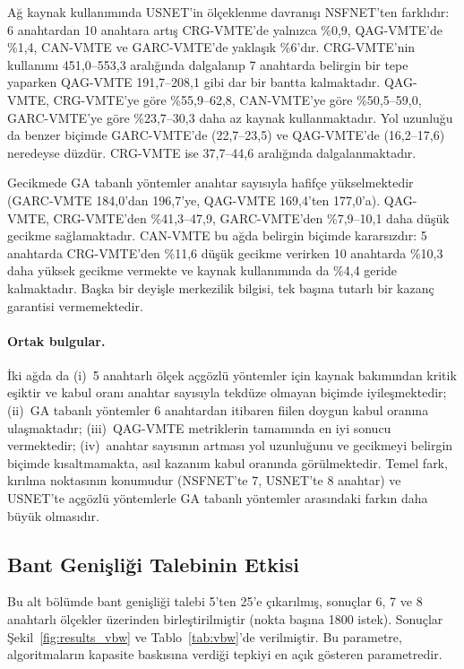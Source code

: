 \documentclass[10pt,twocolumn]{article}
\begin{document}
Ağ kaynak kullanımında USNET'in ölçeklenme davranışı NSFNET'ten farklıdır: 6 anahtardan 10 anahtara artış CRG-VMTE'de yalnızca \%0,9, QAG-VMTE'de \%1,4, CAN-VMTE ve GARC-VMTE'de yaklaşık \%6'dır. CRG-VMTE'nin kullanımı 451,0--553,3 aralığında dalgalanıp 7 anahtarda belirgin bir tepe yaparken QAG-VMTE 191,7--208,1 gibi dar bir bantta kalmaktadır. QAG-VMTE, CRG-VMTE'ye göre \%55,9--62,8, CAN-VMTE'ye göre \%50,5--59,0, GARC-VMTE'ye göre \%23,7--30,3 daha az kaynak kullanmaktadır. Yol uzunluğu da benzer biçimde GARC-VMTE'de (22,7--23,5) ve QAG-VMTE'de (16,2--17,6) neredeyse düzdür. CRG-VMTE ise 37,7--44,6 aralığında dalgalanmaktadır.

Gecikmede GA tabanlı yöntemler anahtar sayısıyla hafifçe yükselmektedir (GARC-VMTE 184,0'dan 196,7'ye, QAG-VMTE 169,4'ten 177,0'a). QAG-VMTE, CRG-VMTE'den \%41,3--47,9, GARC-VMTE'den \%7,9--10,1 daha düşük gecikme sağlamaktadır. CAN-VMTE bu ağda belirgin biçimde kararsızdır: 5 anahtarda CRG-VMTE'den \%11,6 düşük gecikme verirken 10 anahtarda \%10,3 daha yüksek gecikme vermekte ve kaynak kullanımında da \%4,4 geride kalmaktadır. Başka bir deyişle merkezilik bilgisi, tek başına tutarlı bir kazanç garantisi vermemektedir.

\paragraph{Ortak bulgular.} İki ağda da (i)~5 anahtarlı ölçek açgözlü yöntemler için kaynak bakımından kritik eşiktir ve kabul oranı anahtar sayısıyla tekdüze olmayan biçimde iyileşmektedir; (ii)~GA tabanlı yöntemler 6 anahtardan itibaren fiilen doygun kabul oranına ulaşmaktadır; (iii)~QAG-VMTE metriklerin tamamında en iyi sonucu vermektedir; (iv)~anahtar sayısının artması yol uzunluğunu ve gecikmeyi belirgin biçimde kısaltmamakta, asıl kazanım kabul oranında görülmektedir. Temel fark, kırılma noktasının konumudur (NSFNET'te 7, USNET'te 8 anahtar) ve USNET'te açgözlü yöntemlerle GA tabanlı yöntemler arasındaki farkın daha büyük olmasıdır.

\subsection{Bant Genişliği Talebinin Etkisi}

Bu alt bölümde bant genişliği talebi 5'ten 25'e çıkarılmış, sonuçlar 6, 7 ve 8 anahtarlı ölçekler üzerinden birleştirilmiştir (nokta başına 1800 istek). Sonuçlar Şekil~\ref{fig:results_vbw} ve Tablo~\ref{tab:vbw}'de verilmiştir. Bu parametre, algoritmaların kapasite baskısına verdiği tepkiyi en açık gösteren parametredir.
\end{document}
